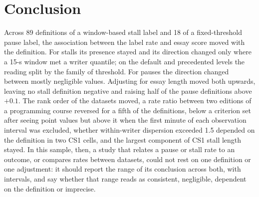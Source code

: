 \section{Conclusion}
\label{sec:conclusion}

Across 89 definitions of a window-based stall label and 18 of a fixed-threshold pause label, the association between
the label rate and essay score moved with the definition. For stalls its presence stayed and its direction changed only
where a 15-s window met a writer quantile; on the default and precedented levels the reading split by the family of
threshold. For pauses the direction changed between mostly negligible values. Adjusting for essay length moved both
upwards, leaving no stall definition negative and raising half of the pause definitions above $+0.1$. The rank order of
the datasets moved, a rate ratio between two editions of a programming course reversed for a fifth of the definitions,
below a criterion set after seeing point values but above it when the first minute of each observation interval was
excluded, whether within-writer dispersion exceeded 1.5 depended on the
definition in two CS1 cells, and the largest component of CS1 stall length stayed. In this sample, then, a study that
relates a pause or stall rate to an outcome, or compares rates between datasets, could not rest on one definition or
one adjustment: it should report the range of its conclusion across both, with intervals, and say whether that range
reads as consistent, negligible, dependent on the definition or imprecise.
